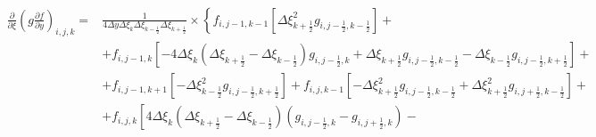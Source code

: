 \documentclass[12pt, a4paper]{article}
\newcommand\onehalf{\frac{1}{2}} %
\begin{document}
\begin{equation*}
    \begin{split}
        \left.
            \frac
                {\partial}
                {\partial \xi}
            \left(
                g
                \frac
                    {\partial f}
                    {\partial y}
            \right)
        \right._{i, j, k}
        = &
        \frac
            {1}
            {
                4 
                \Delta y
                \Delta \xi_{k}
                \Delta \xi_{k - \onehalf}
                \Delta \xi_{k + \onehalf}
            }
        \times
        \left\{
            f_{i, j - 1, k - 1}
            \left[
                \Delta \xi^2_{k + \onehalf}
                g_{i, j - \onehalf, k - \onehalf}
            \right]
            +
        \right.
        \\ &
        \left.
            +
            f_{i, j - 1, k}
            \left[
                -
                4 \Delta \xi_{k}
                \left(
                    \Delta \xi_{k + \onehalf}
                    -
                    \Delta \xi_{k - \onehalf}
                \right)
                g_{i, j - \onehalf, k}
                +
                \Delta \xi_{k + \onehalf}
                g_{i, j  - \onehalf, k - \onehalf}
                -
                \Delta \xi_{k - \onehalf}
                g_{i, j - \onehalf, k + \onehalf}
            \right]
            +
        \right.
        \\ &
        \left.
            +
            f_{i, j - 1, k + 1}
            \left[
                -
                \Delta \xi^2_{k - \onehalf}
                g_{i, j - \onehalf, k + \onehalf}
            \right]
            +
            f_{i, j, k - 1}
            \left[
                -
                \Delta \xi^2_{k + \onehalf}
                g_{i, j  - \onehalf, k - \onehalf}
                +
                \Delta \xi^2_{k + \onehalf}
                g_{i, j + \onehalf, k - \onehalf}
            \right]
            +
        \right.
        \\ &
        \left.
            +
            f_{i, j, k}
            \left[
                4
                \Delta \xi_{k}
                \left(
                    \Delta \xi_{k + \onehalf}
                    -
                    \Delta \xi_{k - \onehalf}
                \right)
                \left(
                    g_{i, j - \onehalf, k}
                    -
                    g_{i, j  + \onehalf, k}
                \right)
                -
            \right.

\end{split}
\end{equation*}
\end{document}
